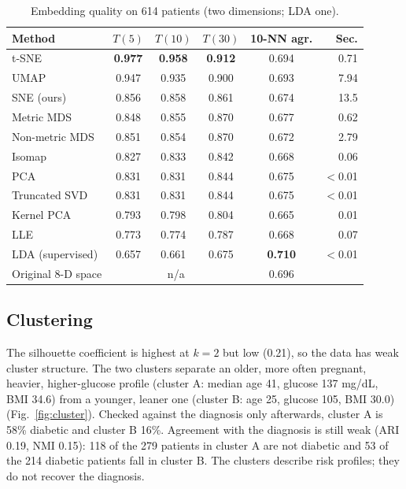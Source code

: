 \documentclass[conference]{IEEEtran}
\begin{document}
\begin{table}[!tb]
\centering
\caption{Embedding quality on 614 patients (two dimensions; LDA one).}
\label{tab:emb}
\footnotesize
\setlength{\tabcolsep}{3.5pt}
\begin{tabular}{@{}lccccr@{}}
\toprule
Method & $T(5)$ & $T(10)$ & $T(30)$ & 10-NN agr. & Sec. \\
\midrule
t-SNE & \textbf{0.977} & \textbf{0.958} & \textbf{0.912} & 0.694 & 0.71 \\
UMAP & 0.947 & 0.935 & 0.900 & 0.693 & 7.94 \\
SNE (ours) & 0.856 & 0.858 & 0.861 & 0.674 & 13.5 \\
Metric MDS & 0.848 & 0.855 & 0.870 & 0.677 & 0.62 \\
Non-metric MDS & 0.851 & 0.854 & 0.870 & 0.672 & 2.79 \\
Isomap & 0.827 & 0.833 & 0.842 & 0.668 & 0.06 \\
PCA & 0.831 & 0.831 & 0.844 & 0.675 & $<$0.01 \\
Truncated SVD & 0.831 & 0.831 & 0.844 & 0.675 & $<$0.01 \\
Kernel PCA & 0.793 & 0.798 & 0.804 & 0.665 & 0.01 \\
LLE & 0.773 & 0.774 & 0.787 & 0.668 & 0.07 \\
LDA (supervised) & 0.657 & 0.661 & 0.675 & \textbf{0.710} & $<$0.01 \\
\midrule
Original 8-D space & \multicolumn{3}{c}{n/a} & 0.696 & \\
\bottomrule
\end{tabular}
\end{table}

\subsection{Clustering}
The silhouette coefficient is highest at $k=2$ but low (0.21), so the data has weak cluster structure. The two clusters separate an older, more often pregnant, heavier, higher-glucose profile (cluster A: median age 41, glucose 137 mg/dL, BMI 34.6) from a younger, leaner one (cluster B: age 25, glucose 105, BMI 30.0) (Fig.~\ref{fig:cluster}). Checked against the diagnosis only afterwards, cluster A is 58\% diabetic and cluster B 16\%. Agreement with the diagnosis is still weak (ARI 0.19, NMI 0.15): 118 of the 279 patients in cluster A are not diabetic and 53 of the 214 diabetic patients fall in cluster B. The clusters describe risk profiles; they do not recover the diagnosis.
\end{document}
